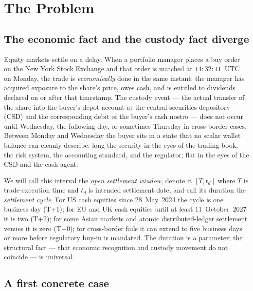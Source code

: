 \documentclass[11pt,a4paper]{article}
\begin{document}
\tableofcontents
\clearpage

\section{The Problem}
\label{sec:problem}

\subsection{The economic fact and the custody fact diverge}

Equity markets settle on a delay. When a portfolio manager places a buy order on the New York Stock Exchange and that order is matched at $14{:}32{:}11$~UTC on Monday, the trade is \emph{economically} done in the same instant: the manager has acquired exposure to the share's price, owes cash, and is entitled to dividends declared on or after that timestamp. The custody event --- the actual transfer of the share into the buyer's depot account at the central securities depository (CSD) and the corresponding debit of the buyer's cash nostro --- does not occur until Wednesday, the following day, or sometimes Thursday in cross-border cases. Between Monday and Wednesday the buyer sits in a state that no scalar wallet balance can cleanly describe: long the security in the eyes of the trading book, the risk system, the accounting standard, and the regulator; flat in the eyes of the CSD and the cash agent.

We will call this interval the \emph{open settlement window}, denote it $[T, t_d]$ where $T$ is trade-execution time and $t_d$ is intended settlement date, and call its duration the \emph{settlement cycle}. For US cash equities since 28~May~2024 the cycle is one business day (T+1); for EU and UK cash equities until at least 11~October~2027 it is two (T+2); for some Asian markets and atomic distributed-ledger settlement venues it is zero (T+0); for cross-border fails it can extend to five business days or more before regulatory buy-in is mandated. The duration is a parameter; the structural fact --- that economic recognition and custody movement do not coincide --- is universal.

\subsection{A first concrete case}
\end{document}
